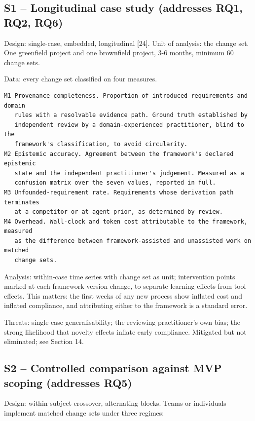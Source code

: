 \documentclass[11pt,a4paper]{article}
\begin{document}
\subsection{S1 -- Longitudinal case study (addresses RQ1, RQ2, RQ6)}

Design: single-case, embedded, longitudinal [24]. Unit of analysis: the change set. One greenfield project and one brownfield project, 3-6 months, minimum 60 change sets.

Data: every change set classified on four measures.

\begin{Verbatim}[fontsize=\footnotesize,breaklines=true,breakanywhere=true,breakautoindent=false,samepage=false]
M1 Provenance completeness. Proportion of introduced requirements and domain
   rules with a resolvable evidence path. Ground truth established by
   independent review by a domain-experienced practitioner, blind to the
   framework's classification, to avoid circularity.
M2 Epistemic accuracy. Agreement between the framework's declared epistemic
   state and the independent practitioner's judgement. Measured as a
   confusion matrix over the seven values, reported in full.
M3 Unfounded-requirement rate. Requirements whose derivation path terminates
   at a competitor or at agent prior, as determined by review.
M4 Overhead. Wall-clock and token cost attributable to the framework, measured
   as the difference between framework-assisted and unassisted work on matched
   change sets.
\end{Verbatim}

Analysis: within-case time series with change set as unit; intervention points marked at each framework version change, to separate learning effects from tool effects. This matters: the first weeks of any new process show inflated cost and inflated compliance, and attributing either to the framework is a standard error.

Threats: single-case generalisability; the reviewing practitioner's own bias; the strong likelihood that novelty effects inflate early compliance. Mitigated but not eliminated; see Section 14.

\subsection{S2 -- Controlled comparison against MVP scoping (addresses RQ5)}

Design: within-subject crossover, alternating blocks. Teams or individuals implement matched change sets under three regimes:
\end{document}
